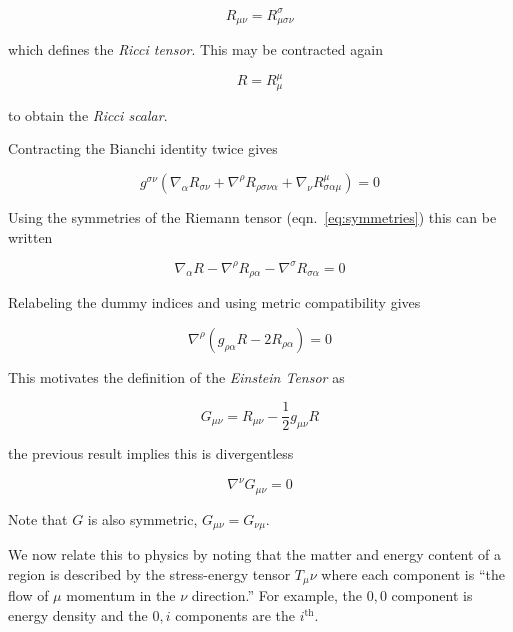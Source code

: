 \begin{equation}
R_{\mu\nu} = R^\sigma_{\mu\sigma\nu}
\end{equation}

which defines the \emph{Ricci tensor}.  This may be contracted again

\begin{equation}
R = R^\mu_\mu
\end{equation}

to obtain the \emph{Ricci scalar}.

Contracting the Bianchi identity twice gives

\begin{equation*}
g^{\sigma\nu}
\left(\nabla_\alpha R_{\sigma\nu}
+ \nabla^\rho R_{\rho\sigma\nu\alpha}
+ \nabla_\nu R^\mu_{\sigma\alpha\mu}\right) = 0
\end{equation*}

Using the symmetries of the Riemann tensor (eqn.~\ref{eq:symmetries})
this can be written

\begin{equation*}
\nabla_\alpha R
- \nabla^\rho R_{\rho\alpha}
- \nabla^\sigma R_{\sigma\alpha} = 0
\end{equation*}

Relabeling the dummy indices and using metric compatibility gives

\begin{equation*}
\nabla^\rho \left(g_{\rho\alpha} R - 2 R_{\rho\alpha} \right) = 0
\end{equation*}

This motivates the definition of the \emph{Einstein Tensor} as

\begin{equation}
\label{eq:einstein_tensor}
G_{\mu\nu} = R_{\mu\nu} - \frac{1}{2} g_{\mu\nu} R
\end{equation}

the previous result implies this is divergentless

\begin{equation*}
\nabla^\nu G_{\mu\nu} = 0
\end{equation*}

Note that $G$ is also symmetric, $G_{\mu\nu} = G_{\nu\mu}$.

We now relate this to physics by noting that the matter and energy
content of a region is described by the stress-energy tensor
$T_\mu\nu$ where each component is ``the flow of $\mu$ momentum in the
$\nu$ direction.''  For example, the $0,0$ component is energy density
and the $0,i$ components are the $i^\mathrm{th}$.

